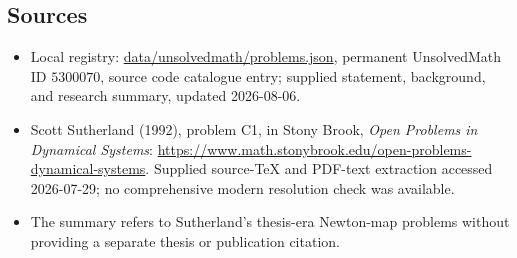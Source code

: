 \documentclass[11pt]{article}
\begin{document}
\subsection{Sources}
\begin{itemize}
\item Local registry: \url{data/unsolvedmath/problems.json}, permanent UnsolvedMath ID \(5300070\), source code catalogue entry; supplied statement, background, and research summary, updated 2026-08-06.
\item Scott Sutherland (1992), problem C1, in Stony Brook, \emph{Open Problems in Dynamical Systems}: \url{https://www.math.stonybrook.edu/open-problems-dynamical-systems}. Supplied source-TeX and PDF-text extraction accessed 2026-07-29; no comprehensive modern resolution check was available.
\item The summary refers to Sutherland's thesis-era Newton-map problems without providing a separate thesis or publication citation.
\end{itemize}
\end{document}
